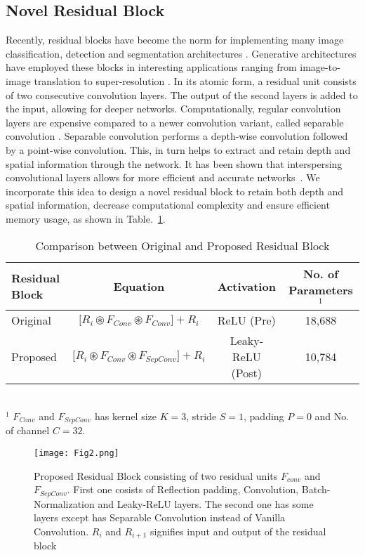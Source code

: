 \documentclass[runningheads]{llncs}
\begin{document}
\subsection{Novel Residual Block}
\label{subsec:residualblock}

Recently, residual blocks have become the norm for implementing many image classification, detection and segmentation architectures \cite{he2016identity}. Generative architectures have employed these blocks in interesting applications ranging from image-to-image translation to super-resolution \cite{johnson2016perceptual,wang2018high}. In its atomic form, a residual unit consists of two consecutive convolution layers. The output of the second layers is added to the input, allowing for deeper networks. Computationally, regular convolution layers are expensive compared to a newer convolution variant, called separable convolution \cite{chollet2017xception}. Separable convolution performs a depth-wise convolution followed by a point-wise convolution. This, in turn helps to extract and retain depth and spatial information through the network. It has been shown that interspersing convolutional layers allows for more efficient and accurate networks~\cite{opticnet19}. We incorporate this idea to design a novel residual block to retain both depth and spatial information, decrease computational complexity and ensure efficient memory usage, as shown in Table.~\ref{table1}.

\begin{table}[htb]
\caption{Comparison between Original and Proposed Residual Block}
    \label{table1}
\centering
\begin{tabular}{l|c|c|c} 
\hline
\small Residual Block & \small Equation & \small Activation & \small No. of Parameters$^{1}$\\
\hline
\small Original
& \small $\big[R_{i}  \circledast F_{Conv} \circledast F_{Conv} \big] + R_{i}$ & \small ReLU (Pre) \cite{he2016identity}& \small 18,688 \\ 
\small Proposed  & \small $\big[R_{i}  \circledast F_{Conv} \circledast F_{SepConv} \big] + R_{i}$ &  \small Leaky-ReLU (Post) & \small 10,784\\ 
\hline
\end{tabular}
\footnotesize
\\$^1$ $F_{Conv}$ and $F_{SepConv}$ has kernel size $K=3$, stride $S=1$, padding $P=0$ and No. of channel $C=32$.
\end{table}


\begin{figure}[htb]
    \centering
    \texttt{[image: Fig2.png]}
    \caption{Proposed Residual Block consisting of two residual units $F_{conv}$ and $F_{SepConv}$. First one cosists of Reflection padding, Convolution, Batch-Normalization and Leaky-ReLU layers. The second one has some layers except has Separable Convolution instead of Vanilla Convolution. $R_i$ and $R_{i+1}$ signifies input and output of the residual block} 
    \label{fig2}
\end{figure}
\end{document}
